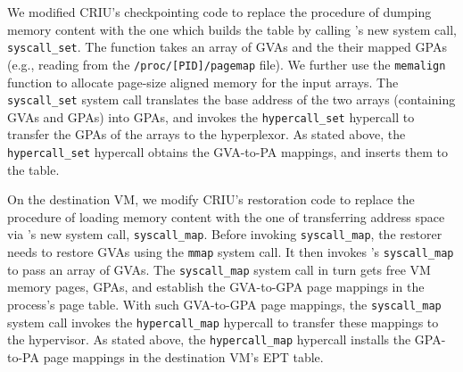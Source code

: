 We modified CRIU's checkpointing code to replace the procedure of dumping memory content with the one which builds the \arch table by calling \arch's new system call, \texttt{syscall\_set}. The function takes an array of GVAs and the their mapped GPAs (e.g., reading from the \texttt{/proc/[PID]/pagemap} file).
We further use the \texttt{memalign} function to allocate page-size aligned memory for the input arrays. The \texttt{syscall\_set} system call translates the base address of the two arrays (containing GVAs and GPAs) into GPAs, and invokes the \texttt{hypercall\_set} hypercall to transfer the GPAs of the arrays to the hyperplexor.  
As stated above, the \texttt{hypercall\_set} hypercall obtains the GVA-to-PA mappings, and inserts them to the \arch table.

 On the destination VM, we modify CRIU's restoration code to replace the procedure of loading memory content with the one of transferring address space via \arch's new system call, \texttt{syscall\_map}. Before invoking  \texttt{syscall\_map}, the restorer needs to restore GVAs using the \texttt{mmap} system call. It then invokes \arch's \texttt{syscall\_map} to pass an array of GVAs. The \texttt{syscall\_map} system call in turn gets free VM memory pages, GPAs, and establish the GVA-to-GPA page mappings in the process's page table. With such GVA-to-GPA page mappings, the \texttt{syscall\_map} system call invokes the \texttt{hypercall\_map} hypercall to transfer these mappings to the hypervisor. As stated above, the \texttt{hypercall\_map} hypercall installs the GPA-to-PA page mappings in the destination VM's EPT table.

